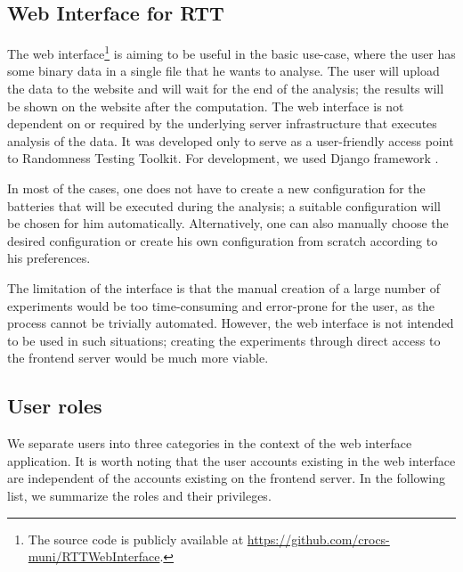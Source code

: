 \documentclass[
	digital,    %
	oneside,    %
	color,
	11pt,
	nocover,
	notable,
	nolof,
	nolot,
]{fithesis3}
\theoremstyle{definition}
\theoremstyle{remark}
\begin{document}
\subsection{Web Interface for RTT}
The web interface\footnote{The source code is publicly available at \url{https://github.com/crocs-muni/RTTWebInterface}.} is aiming to be useful in the basic use-case, where the user has some binary data in a single file that he wants to analyse. The user will upload the data to the website and will wait for the end of the analysis; the results will be shown on the website after the computation. The web interface is not dependent on or required by the underlying server infrastructure that executes analysis of the data. It was developed only to serve as a user-friendly access point to Randomness Testing Toolkit. For development, we used Django framework \cite{django}.

In most of the cases, one does not have to create a new configuration for the batteries that will be executed during the analysis; a suitable configuration will be chosen for him automatically. Alternatively, one can also manually choose the desired configuration or create his own configuration from scratch according to his preferences.

The limitation of the interface is that the manual creation of a large number of experiments would be too time-consuming and error-prone for the user, as the process cannot be trivially automated. However, the web interface is not intended to be used in such situations; creating the experiments through direct access to the frontend server would be much more viable. 

\subsection*{User roles}
We separate users into three categories in the context of the web interface application. It is worth noting that the user accounts existing in the web interface are independent of the accounts existing on the frontend server. In the following list, we summarize the roles and their privileges.
\end{document}
